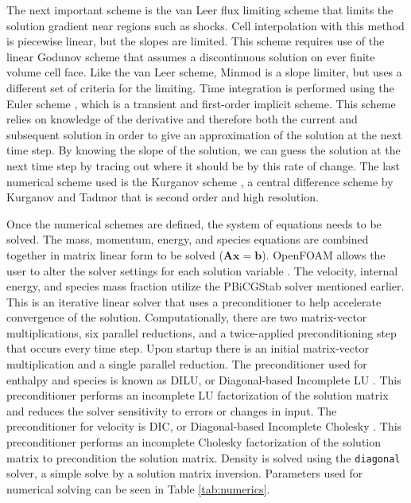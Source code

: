 The next important scheme is the van Leer \cite{vanleer} flux limiting scheme that limits the solution gradient near regions such as shocks. Cell interpolation with this method is piecewise linear, but the slopes are limited. This scheme requires use of the linear Godunov scheme \cite{godunov} that assumes a discontinuous solution on ever finite volume cell face. Like the van Leer scheme, Minmod \cite{minmod} is a slope limiter, but uses a different set of criteria for the limiting. Time integration is performed using the Euler scheme \cite{euler}, which is a transient and first-order implicit scheme. This scheme relies on knowledge of the derivative and therefore both the current and subsequent solution in order to give an approximation of the solution at the next time step. By knowing the slope of the solution, we can guess the solution at the next time step by tracing out where it should be by this rate of change. The last numerical scheme used is the Kurganov scheme \cite{kurganov1}, a central difference scheme by Kurganov and Tadmor that is second order and high resolution. 

Once the numerical schemes are defined, the system of equations needs to be solved. The mass, momentum, energy, and species equations are combined together in matrix linear form to be solved (\(\bm{Ax} = \bm{b}\)). OpenFOAM allows the user to alter the solver settings for each solution variable \cite{ofug}. The velocity, internal energy, and species mass fraction utilize the PBiCGStab solver mentioned earlier. This is an iterative linear solver that uses a preconditioner to help accelerate convergence of the solution.  Computationally, there are two matrix-vector multiplications, six parallel reductions, and a twice-applied preconditioning step that occurs every time step. Upon startup there is an initial matrix-vector multiplication and a single parallel reduction. The preconditioner used for enthalpy and species is known as DILU, or Diagonal-based Incomplete LU \cite{saad}. This preconditioner performs an incomplete LU factorization \cite{schwarzenberg} of the solution matrix and reduces the solver sensitivity to errors or changes in input. The preconditioner for velocity is DIC, or Diagonal-based Incomplete Cholesky \cite{golub}. This preconditioner performs an incomplete Cholesky factorization of the solution matrix to precondition the solution matrix. Density is solved using the \verb|diagonal| solver, a simple solve by a solution matrix inversion. Parameters used for numerical solving can be seen in Table \ref{tab:numerics}.

